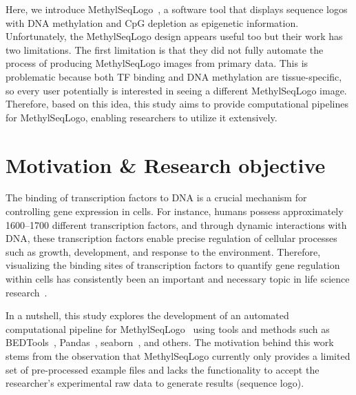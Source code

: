\documentclass{PHlab-thesis}
\begin{document}
Here, we introduce MethylSeqLogo~\cite{Hsu2022.11.05.515271}, a software tool that displays sequence logos with DNA methylation and CpG depletion as epigenetic information. Unfortunately, the MethylSeqLogo design appears useful too but their work has two limitations. The first limitation is that they did not fully automate the process of producing MethylSeqLogo images from primary data. This is problematic because both TF binding and DNA methylation are tissue-specific, so every user potentially is interested in seeing a different MethylSeqLogo image. Therefore, based on this idea, this study aims to provide computational pipelines for MethylSeqLogo, enabling researchers to utilize it extensively.
\section{Motivation \& Research objective}
The binding of transcription factors to DNA is a crucial mechanism for controlling gene expression in cells. For instance, humans possess approximately 1600--1700 different transcription factors, and through dynamic interactions with DNA, these transcription factors enable precise regulation of cellular processes such as growth, development, and response to the environment. Therefore, visualizing the binding sites of transcription factors to quantify gene regulation within cells has consistently been an important and necessary topic in life science research~\cite{vaquerizas2009census,liu2017transcriptional}.

In a nutshell, this study explores the development of an automated computational pipeline for MethylSeqLogo~\cite{Hsu2022.11.05.515271} using tools and methods such as BEDTools~\cite{10.1093/bioinformatics/btq033}, Pandas~\cite{mckinney2010data}, seaborn~\cite{Waskom2021}, and others. The motivation behind this work stems from the observation that MethylSeqLogo currently only provides a limited set of pre-processed example files and lacks the functionality to accept the researcher's experimental raw data to generate results (sequence logo).
\end{document}
